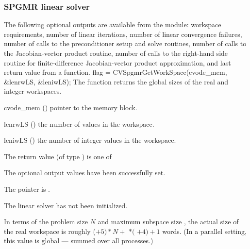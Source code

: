 \subsubsection{SPGMR linear solver}\label{sss:optout_spgmr}
The following optional outputs are available from the {\cvspgmr} module:
workspace requirements, number of linear iterations, number of linear
convergence failures, number of calls to the preconditioner setup and
solve routines, number of calls to the Jacobian-vector product
routine, number of calls to the right-hand side routine for
finite-difference Jacobian-vector product approximation, and last
return value from a {\cvspgmr} function.
{
  flag = CVSpgmrGetWorkSpace(cvode\_mem, \&lenrwLS, \&leniwLS);
}
{
  The function  returns the global sizes of the
  {\cvspgmr} real and integer workspaces.
}
{
  \begin{args}
  \item[cvode\_mem] ()
    pointer to the {\cvodes} memory block.
  \item[lenrwLS] ()
    the number of  values in the {\cvspgmr} workspace.
  \item[leniwLS] ()
    the number of integer values in the {\cvspgmr} workspace.
  \end{args}
}
{
  The return value  (of type ) is one of
  \begin{args}
  \item[\Id{CVSPGMR\_SUCCESS}] 
    The optional output values have been successfully set.
  \item[\Id{CVSPGMR\_MEM\_NULL}]
    The  pointer is .
  \item[\Id{CVSPGMR\_LMEM\_NULL}]
    The {\cvspgmr} linear solver has not been initialized.
  \end{args}
}
{
  In terms of the problem size $N$ and maximum subspace size , 
  the actual size of the real workspace is roughly
  ($+ 5)*N +$  $*($ $ + 4) + 1$ 
  words.  (In a parallel setting, this value is global --- summed over
  all processes.)
}
